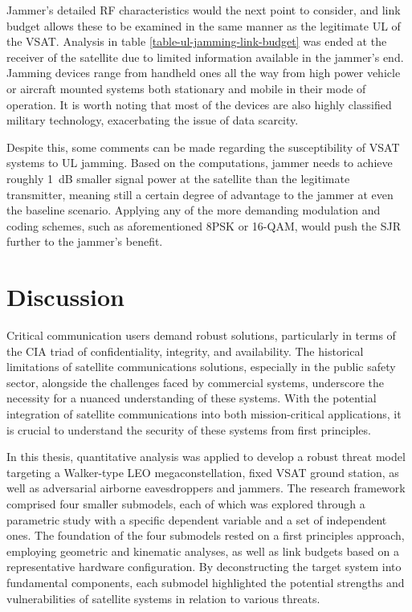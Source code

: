 \documentclass[english, 12pt, a4paper, elec, utf8, a-1b, online]{aaltothesis}
\begin{document}
Jammer's detailed RF characteristics would the next point to consider, and link budget allows these to be examined in the same manner as the legitimate UL of the VSAT.
Analysis in table \ref{table-ul-jamming-link-budget} was ended at the receiver of the satellite due to limited information available in the jammer's end.
Jamming devices range from handheld ones all the way from high power vehicle or aircraft mounted systems both stationary and mobile in their mode of operation.
It is worth noting that most of the devices are also highly classified military technology, exacerbating the issue of data scarcity.

Despite this, some comments can be made regarding the susceptibility of VSAT systems to UL jamming.
Based on the computations, jammer needs to achieve roughly \SI{1}{\deci\bel} smaller signal power at the satellite than the legitimate transmitter, meaning still a certain degree of advantage to the jammer at even the baseline scenario.
Applying any of the more demanding modulation and coding schemes, such as aforementioned 8PSK or 16-QAM, would push the SJR further to the jammer's benefit.

\clearpage

\section{Discussion}

Critical communication users demand robust solutions, particularly in terms of the CIA triad of confidentiality, integrity, and availability.
The historical limitations of satellite communications solutions, especially in the public safety sector, alongside the challenges faced by commercial systems, underscore the necessity for a nuanced understanding of these systems.
With the potential integration of satellite communications into both mission-critical applications, it is crucial to understand the security of these systems from first principles.

In this thesis, quantitative analysis was applied to develop a robust threat model targeting a Walker-type LEO megaconstellation, fixed VSAT ground station, as well as adversarial airborne eavesdroppers and jammers. The research framework comprised four smaller submodels, each of which was explored through a parametric study with a specific dependent variable and a set of independent ones.
The foundation of the four submodels rested on a first principles approach, employing geometric and kinematic analyses, as well as link budgets based on a representative hardware configuration.
By deconstructing the target system into fundamental components, each submodel highlighted the potential strengths and vulnerabilities of satellite systems in relation to various threats.
\end{document}
